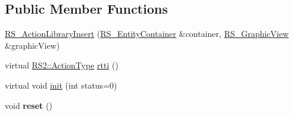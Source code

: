 \subsection*{Public Member Functions}
\begin{DoxyCompactItemize}
\item 
\hyperlink{classRS__ActionLibraryInsert_aed48a462d6a7b48731c2c00feb665da5}{R\-S\-\_\-\-Action\-Library\-Insert} (\hyperlink{classRS__EntityContainer}{R\-S\-\_\-\-Entity\-Container} \&container, \hyperlink{classRS__GraphicView}{R\-S\-\_\-\-Graphic\-View} \&graphic\-View)
\item 
virtual \hyperlink{classRS2_afe3523e0bc41fd637b892321cfc4b9d7}{R\-S2\-::\-Action\-Type} \hyperlink{classRS__ActionLibraryInsert_ada7d91bb592ec67597e1dd05f9e07e7b}{rtti} ()
\item 
virtual void \hyperlink{classRS__ActionLibraryInsert_aa1a625415f562391169faae3aeea1bcb}{init} (int status=0)
\item 
\hypertarget{classRS__ActionLibraryInsert_a29a99c4c2e3382c453462c49ae6fbdf1}{void {\bfseries reset} ()}\label{classRS__ActionLibraryInsert_a29a99c4c2e3382c453462c49ae6fbdf1}


\end{DoxyCompactItemize}
